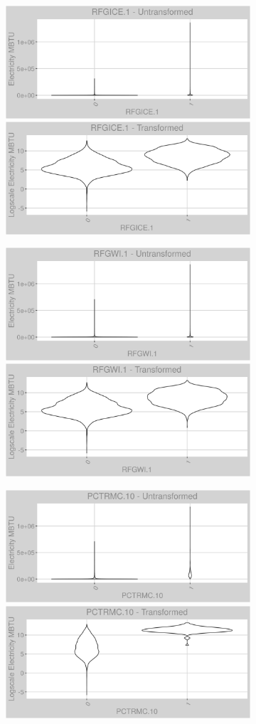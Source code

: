 \newpage
\begin{figure}
\centering
\begin{subfigure}{1\textwidth}
\centering
\includegraphics[width=.49\textwidth, height=0.3\textheight]{Images/electricity_var_original_18.png}
\includegraphics[width=.49\textwidth, height=0.3\textheight]{Images/electricity_var_transformed_18.png}
\end{subfigure}
\begin{subfigure}{1\textwidth}
\centering
\includegraphics[width=.49\textwidth, height=0.3\textheight]{Images/electricity_var_original_19.png}
\includegraphics[width=.49\textwidth, height=0.3\textheight]{Images/electricity_var_transformed_19.png}
\end{subfigure}
\begin{subfigure}{1\textwidth}
\centering
\includegraphics[width=.49\textwidth, height=0.3\textheight]{Images/electricity_var_original_20.png}
\includegraphics[width=.49\textwidth, height=0.3\textheight]{Images/electricity_var_transformed_20.png}
\end{subfigure}
\end{figure}
